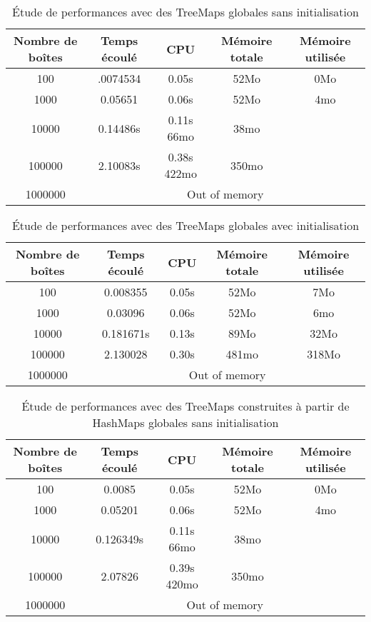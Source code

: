 \begin{table}[h]
  \centering
\begin{tabular}{|c|c|c|c|c|}
\hline
Nombre de boîtes & Temps écoulé & CPU & Mémoire totale & Mémoire utilisée\\
\hline
100 & .0074534& 0.05s & 52Mo & 0Mo\\
\hline
1000 & 0.05651 & 0.06s & 52Mo & 4mo\\
\hline
10000 & 0.14486s & 0.11s 66mo & 38mo\\
\hline
100000 & 2.10083s & 0.38s 422mo & 350mo\\
\hline
1000000 & \multicolumn{4}{|c|}{Out of memory}\\
\hline
\end{tabular}
\caption{Étude de performances avec des TreeMaps globales sans initialisation} 
\label{tab:treemapglobal}
\end{table}

\begin{table}[h]
  \centering
\begin{tabular}{|c|c|c|c|c|}
\hline
Nombre de boîtes & Temps écoulé & CPU & Mémoire totale & Mémoire utilisée\\
\hline
100 & 0.008355 & 0.05s & 52Mo & 7Mo\\
\hline
1000 & 0.03096 & 0.06s & 52Mo & 6mo\\
\hline
10000 & 0.181671s & 0.13s & 89Mo & 32Mo\\
\hline
100000 & 2.130028 & 0.30s & 481mo & 318Mo\\
\hline
1000000 & \multicolumn{4}{|c|}{Out of memory}\\
\hline
\end{tabular}
\caption{Étude de performances avec des TreeMaps globales avec initialisation}
\label{tab:treemapglobalInit}
\end{table}






\begin{table}[h]
  \centering
\begin{tabular}{|c|c|c|c|c|}
\hline
Nombre de boîtes & Temps écoulé & CPU & Mémoire totale & Mémoire utilisée\\
\hline
100 & 0.0085 & 0.05s & 52Mo & 0Mo\\
\hline
1000 & 0.05201 & 0.06s & 52Mo & 4mo\\
\hline
10000 & 0.126349s & 0.11s 66mo & 38mo\\
\hline
100000 & 2.07826 & 0.39s 420mo & 350mo\\
\hline
1000000 & \multicolumn{4}{|c|}{Out of memory}\\
\hline
\end{tabular}
\caption{Étude de performances avec des TreeMaps construites à partir de HashMaps globales sans initialisation} 
\label{tab:treehashmapglobal}
\end{table}

